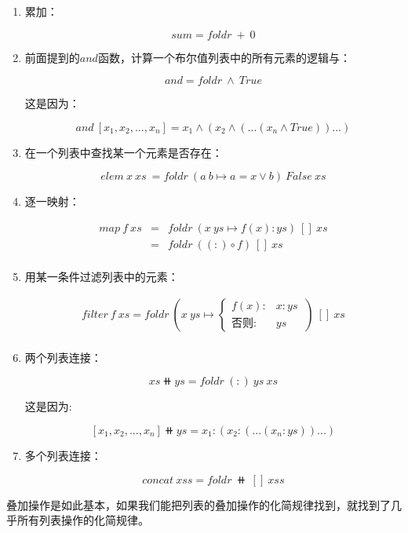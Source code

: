 \documentclass{article}
\begin{document}
\begin{enumerate}
\item 累加：

\[
sum = foldr\ +\ 0
\]

\item 前面提到的$and$函数，计算一个布尔值列表中的所有元素的逻辑与：

\[
and = foldr\ \land\ True
\]

这是因为：

\[
and\ [x_1, x_2, ..., x_n] = x_1 \land (x_2 \land (...(x_n \land True))...)
\]

\item 在一个列表中查找某一个元素是否存在：

\[
elem\ x\ xs\ = foldr\ (a\ b \mapsto a = x \lor b)\ False\ xs
\]

\item 逐一映射：

\[
\begin{array}{rcl}
map\ f\ xs & = & foldr\ (x\ ys \mapsto f(x) : ys)\ []\ xs \\
           & = & foldr\ ((:) \circ f)\ []\ xs \\
\end{array}
\]

\item 用某一条件过滤列表中的元素：

\[
\begin{array}{rl}
filter\ f\ xs = foldr\ (x\ ys \mapsto
  \begin{cases}
    f(x): & x:ys\ \\
    \text{否则}: & ys
  \end{cases})\ []\ xs \\
\end{array}
\]

\item 两个列表连接：

\[
xs \doubleplus ys = foldr\ (:)\ ys\ xs
\label{eq:binary-concat}
\]

这是因为:

\[
[x_1, x_2, ..., x_n] \doubleplus ys = x_1 : (x_2 : (...(x_n : ys))...)
\]

\item 多个列表连接：

\[
concat\ xss = foldr\ \doubleplus\ []\ xss
\]

\end{enumerate}

叠加操作是如此基本，如果我们能把列表的叠加操作的化简规律找到，就找到了几乎所有列表操作的化简规律。
\end{document}
